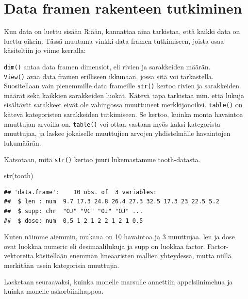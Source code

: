 \documentclass[
]{book}
\newenvironment{Shaded}{\begin{snugshade}}{\end{snugshade}}
\newcommand{\FunctionTok}[1]{\textcolor[rgb]{0.00,0.00,0.00}{#1}}
\newcommand{\NormalTok}[1]{#1}
\newcommand{\SpecialCharTok}[1]{\textcolor[rgb]{0.00,0.00,0.00}{#1}}
\begin{document}
\hypertarget{data-framen-rakenteen-tutkiminen}{%
\section{Data framen rakenteen tutkiminen}\label{data-framen-rakenteen-tutkiminen}}

Kun data on luettu sisään R:ään, kannattaa aina tarkistaa, että kaikki data on luettu oikein. Tässä muutama vinkki data framen tutkimiseen, joista osaa käsiteltiin jo viime kerralla:

\texttt{dim()} antaa data framen dimensiot, eli rivien ja sarakkeiden määrän.\\
\texttt{View()} avaa data framen erilliseen ikkunaan, jossa sitä voi tarkastella. Suositellaan vain pienemmille data frameille
\texttt{str()} kertoo rivien ja sarakkeiden määrät sekä kaikkien sarakkeiden luokat. Kätevä tapa tarkistaa mm. että lukuja sisältävät sarakkeet eivät ole vahingossa muuttuneet merkkijonoiksi.
\texttt{table()} on kätevä kategoristen sarakkeiden tutkimiseen. Se kertoo, kuinka monta havaintoa muuttujan arvoilla on. \texttt{table()} voi ottaa vastaan myös kaksi kategorista muuttujaa, ja laskee jokaiselle muuttujien arvojen yhdistelmälle havaintojen lukumäärän.

Katsotaan, mitä \texttt{str()} kertoo juuri lukemastamme tooth-datasta.

\begin{Shaded}
\begin{Highlighting}[]
\FunctionTok{str}\NormalTok{(tooth)}
\end{Highlighting}
\end{Shaded}

\begin{verbatim}
## 'data.frame':    10 obs. of  3 variables:
##  $ len : num  9.7 17.3 24.8 26.4 27.3 32.5 17.3 23 22.5 5.2
##  $ supp: chr  "OJ" "VC" "OJ" "OJ" ...
##  $ dose: num  0.5 1 2 1 2 2 1 2 1 0.5
\end{verbatim}

Kuten näimme aiemmin, mukana on 10 havaintoa ja 3 muuttujaa. len ja dose ovat luokkaa numeric eli desimaalilukuja ja supp on luokkaa factor. Factor-vektoreita käsitellään enemmän lineaaristen mallien yhteydessä, mutta niillä merkitään usein kategorisia muuttujia.

Lasketaan seuraavaksi, kuinka monelle marsulle annettiin appelsiinimehua ja kuinka monelle askorbiinihappoa.

\begin{Shaded}
\end{Shaded}
\end{document}
